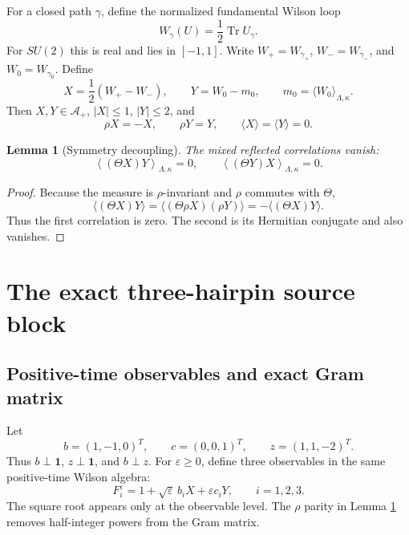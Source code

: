 \documentclass[11pt]{article}
\newtheorem{lemma}[theorem]{Lemma}
\newcommand{\one}{\mathbf 1}
\newcommand{\eps}{\varepsilon}
\newcommand{\Tr}{\operatorname{Tr}}
\begin{document}
For a closed path $\gamma$, define the normalized fundamental Wilson loop
\begin{equation}
  W_\gamma(U)=\frac12\Tr U_\gamma.
  \label{eq:Wilson-loop}
\end{equation}
For $SU(2)$ this is real and lies in $[-1,1]$.  Write $W_+=W_{\gamma_+}$, $W_-=W_{\gamma_-}$, and $W_0=W_{\gamma_0}$.  Define
\begin{equation}
  X=\frac12(W_+-W_-),
  \qquad
  Y=W_0-m_0,
  \qquad
  m_0=\langle W_0\rangle_{\Lambda,\kappa}.
  \label{eq:X-Y}
\end{equation}
Then $X,Y\in\mathcal A_+$, $|X|\le1$, $|Y|\le2$, and
\begin{equation}
  \rho X=-X,
  \qquad
  \rho Y=Y,
  \qquad
  \langle X\rangle=\langle Y\rangle=0.
  \label{eq:parities}
\end{equation}

\begin{lemma}[Symmetry decoupling]
\label{lem:symmetry-decoupling}
The mixed reflected correlations vanish:
\begin{equation}
  \left\langle(\Theta X)Y\right\rangle_{\Lambda,\kappa}=0,
  \qquad
  \left\langle(\Theta Y)X\right\rangle_{\Lambda,\kappa}=0.
  \label{eq:mixed-zero}
\end{equation}
\end{lemma}

\begin{proof}
Because the measure is $\rho$-invariant and $\rho$ commutes with $\Theta$,
\[
  \langle(\Theta X)Y\rangle
  =\langle(\Theta\rho X)(\rho Y)\rangle
  =-\langle(\Theta X)Y\rangle.
\]
Thus the first correlation is zero.  The second is its Hermitian conjugate and also vanishes.
\end{proof}

\section{The exact three-hairpin source block}
\label{sec:exact-block}

\subsection{Positive-time observables and exact Gram matrix}

Let
\begin{equation}
  b=(1,-1,0)^T,
  \qquad
  c=(0,0,1)^T,
  \qquad
  z=(1,1,-2)^T.
  \label{eq:b-c-z}
\end{equation}
Thus $b\perp\one$, $z\perp\one$, and $b\perp z$.  For $\eps\ge0$, define three observables in the same positive-time Wilson algebra:
\begin{equation}
  F_i^\eps
  =1+\sqrt\eps\,b_iX+\eps c_iY,
  \qquad i=1,2,3.
  \label{eq:F-source-family}
\end{equation}
The square root appears only at the observable level.  The $\rho$ parity in Lemma \ref{lem:symmetry-decoupling} removes half-integer powers from the Gram matrix.
\end{document}
